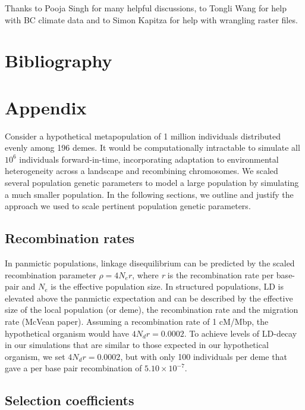 \documentclass[11pt,twoside,lineno]{GSA_format}
\newcommand{\beginsupplement}{%
        \setcounter{table}{0}
        \renewcommand{\thetable}{S\arabic{table}}%
        \setcounter{figure}{0}
        \renewcommand{\thefigure}{S\arabic{figure}}%
     }
\begin{document}
Thanks to Pooja Singh for many helpful discussions, to Tongli Wang for help with BC climate data and to Simon Kapitza for help with wrangling raster files. 


\section{Bibliography}


%
\beginsupplement

\section{Appendix}


Consider a hypothetical metapopulation of 1 million individuals distributed evenly among 196 demes. It would be computationally intractable to simulate all $10^6$ individuals forward-in-time, incorporating adaptation to environmental heterogeneity across a landscape and recombining chromosomes. We scaled several population genetic parameters to model a large population by simulating a much smaller population. In the following sections, we outline and justify the approach we used to scale pertinent population genetic parameters. 

\subsection{Recombination rates}

In panmictic populations, linkage disequilibrium can be predicted by the scaled recombination parameter $\rho = 4N_er$, where \textit{r} is the recombination rate per base-pair and $N_e$ is the effective population size. In structured populations, LD is elevated above the panmictic expectation and can be described by the effective size of the local population (or deme), the recombination rate and the migration rate (McVean paper). Assuming a recombination rate of 1 cM/Mbp, the hypothetical organism would have $4N_dr = 0.0002$. To achieve levels of LD-decay in our simulations that are similar to those expected in our hypothetical organism, we set $4N_dr = 0.0002$, but with only 100 individuals per deme that gave a per base pair recombination of $5.10 \times 10^{-7}$.

\subsection{Selection coefficients} 
\end{document}
